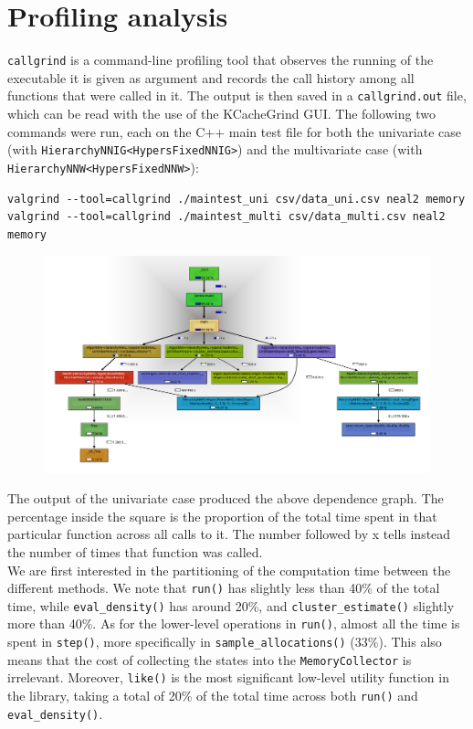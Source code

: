 \section{Profiling analysis}
\verb|callgrind| is a command-line profiling tool that observes the running of the executable it is given as argument and records the call history among all functions that were called in it.
The output is then saved in a \verb|callgrind.out| file, which can be read with the use of the KCacheGrind GUI.
The following two commands were run, each on the C++ main test file for both the univariate case (with \verb|HierarchyNNIG<HypersFixedNNIG>|) and the multivariate case (with \verb|HierarchyNNW<HypersFixedNNW>|):
\begin{verbatim}
valgrind --tool=callgrind ./maintest_uni csv/data_uni.csv neal2 memory
valgrind --tool=callgrind ./maintest_multi csv/data_multi.csv neal2 memory
\end{verbatim}
\begin{figure}[h]
	\hspace{-50pt}
	\includegraphics[scale=0.35]{etc/kcg_uni.png}
\end{figure}
The output of the univariate case produced the above dependence graph. %
The percentage inside the square is the proportion of the total time spent in that particular function across all calls to it.
The number followed by x tells instead the number of times that function was called. \\
We are first interested in the partitioning of the computation time between the different methods.
We note that \verb|run()| has slightly less than 40\% of the total time, while \verb|eval_density()| has around 20\%, and \verb|cluster_estimate()| slightly more than 40\%.
As for the lower-level operations in \verb|run()|, almost all the time is spent in \verb|step()|, more specifically in \verb|sample_allocations()| (33\%).
This also means that the cost of collecting the states into the \verb|MemoryCollector| is irrelevant.
Moreover, \verb|like()| is the most significant low-level utility function in the library, taking a total of 20\% of the total time across both \verb|run()| and \verb|eval_density()|. \\

